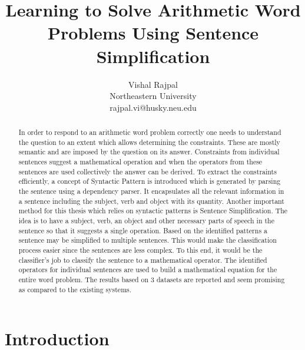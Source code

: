 \documentclass[11pt]{article}
\begin{document}
\title{Learning to Solve Arithmetic Word Problems Using Sentence Simplification}
\author{
	Vishal Rajpal\\
	Northeastern University\\
	rajpal.vi@husky.neu.edu\\
}
\date{}
\maketitle

\begin{abstract}
In order to respond to an arithmetic word problem correctly one needs to understand the question to an extent which allows determining the constraints. These are mostly semantic and are imposed by the question on its answer. Constraints from individual sentences suggest a mathematical operation and when the operators from these sentences are used collectively the answer can be derived. To extract the constraints efficiently, a concept of Syntactic Pattern is introduced which is generated by parsing the sentence using a dependency parser. It encapsulates all the relevant information in a sentence including the subject, verb and object with its quantity. Another important method for this thesis which relies on syntactic patterns is Sentence Simplification. The idea is to have a subject, verb, an object and other necessary parts of speech in the sentence so that it suggests a single operation. Based on the identified patterns a sentence may be simplified to multiple sentences. This would make the classification process easier since the sentences are less complex. To this end, it would be the classifier's job to classify the sentence to a mathematical operator. The identified operators for individual sentences are used to build a mathematical equation for the entire word problem. The results based on 3 datasets are reported and seem promising as compared to the existing systems.
\end{abstract}

\section{Introduction}
\end{document}
